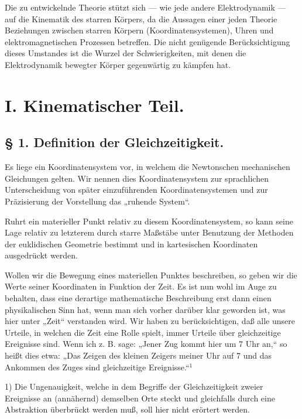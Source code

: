 \documentclass[17pt]{webarticle}       %
\begin{document}
Die zu entwickelnde Theorie stützt sich — wie jede andere Elektrodynamik — auf die Kinematik des starren Körpers, da die Aussagen einer jeden Theorie Beziehungen zwischen starren Körpern (Koordinatensystemen), Uhren und elektromagnetischen Prozessen betreffen. Die nicht genügende Berücksichtigung dieses Umstandes ist die Wurzel der Schwierigkeiten, mit denen die Elektrodynamik bewegter Körper gegenwärtig zu kämpfen hat.

\section*{I. Kinematischer Teil.}

\subsection*{§ 1. Definition der Gleichzeitigkeit.}

Es liege ein Koordinatensystem vor, in welchem die Newtonschen mechanischen Gleichungen gelten. Wir nennen dies Koordinatensystem zur sprachlichen Unterscheidung von später einzuführenden Koordinatensystemen und zur Präzisierung der Vorstellung das „ruhende System“.

Ruhrt ein materieller Punkt relativ zu diesem Koordinatensystem, so kann seine Lage relativ zu letzterem durch starre Maßstäbe unter Benutzung der Methoden der euklidischen Geometrie bestimmt und in kartesischen Koordinaten ausgedrückt werden.

Wollen wir die Bewegung eines materiellen Punktes beschreiben, so geben wir die Werte seiner Koordinaten in Funktion der Zeit. Es ist nun wohl im Auge zu behalten, dass eine derartige mathematische Beschreibung erst dann einen physikalischen Sinn hat, wenn man sich vorher darüber klar geworden ist, was hier unter „Zeit“ verstanden wird. Wir haben zu berücksichtigen, daß alle unsere Urteile, in welchen die Zeit eine Rolle spielt, immer Urteile über gleichzeitige Ereignisse sind. Wenn ich z. B. sage: „Jener Zug kommt hier um 7 Uhr an,“ so heißt dies etwa: „Das Zeigen des kleinen Zeigers meiner Uhr auf 7 und das Ankommen des Zuges sind gleichzeitige Ereignisse.“$^1$

\begin{flushleft}
\footnotesize 1) Die Ungenauigkeit, welche in dem Begriffe der Gleichzeitigkeit zweier Ereignisse an (annähernd) demselben Orte steckt und gleichfalls durch eine Abstraktion überbrückt werden muß, soll hier nicht erörtert werden.
\end{flushleft}
\end{document}
